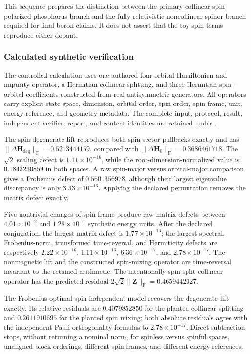 This sequence prepares the distinction between the primary collinear
spin-polarized phosphorus branch and the fully relativistic noncollinear spinor
branch required for final boron claims. It does not assert that the toy spin
terms reproduce either dopant.

\subsubsection{Calculated synthetic verification}

The controlled calculation uses one authored four-orbital Hamiltonian and
impurity operator, a Hermitian collinear splitting, and three Hermitian
spin--orbital coefficients constructed from real antisymmetric generators. All
operators carry explicit state-space, dimension, orbital-order, spin-order,
spin-frame, unit, energy-reference, and geometry metadata. The complete input,
protocol, result, independent verifier, report, and content identities are
retained under
.

The spin-degenerate lift reproduces both spin-sector pullbacks exactly and has
\(\lVert\Delta\mathbf H_{\mathrm{deg}}\rVert_{\mathrm F}
=0.5213444159\), compared with
\(\lVert\Delta\mathbf H_0\rVert_{\mathrm F}=0.3686461718\). The
\(\sqrt{2}\) scaling defect is \(1.11\times10^{-16}\), while the
root-dimension-normalized value is \(0.1843230859\) in both spaces. A raw
spin-major versus orbital-major comparison gives a Frobenius defect of
\(0.5601356978\), although their largest eigenvalue discrepancy is only
\(3.33\times10^{-16}\). Applying the declared permutation removes the matrix
defect exactly.

Five nontrivial changes of spin frame produce raw matrix defects between
\(4.01\times10^{-2}\) and \(1.28\times10^{-1}\) synthetic energy units.
After the declared conjugation, the largest matrix defect is
\(1.77\times10^{-16}\); the largest spectral, Frobenius-norm, transformed
time-reversal, and Hermiticity defects are respectively
\(2.22\times10^{-16}\), \(1.11\times10^{-16}\),
\(6.36\times10^{-17}\), and \(2.78\times10^{-17}\). The nonmagnetic lift
and the constructed spin-mixing operator are time-reversal invariant to the
retained arithmetic. The intentionally spin-split collinear operator has the
predicted residual \(2\sqrt{2}\lVert\mathbf Z\rVert_{\mathrm F}
=0.4659442027\).

The Frobenius-optimal spin-independent model recovers the degenerate lift
exactly. Its relative residuals are \(0.4079852850\) for the planted collinear
splitting and \(0.2611910695\) for the planted spin mixing; both absolute
residuals agree with the independent Pauli-orthogonality formulas to
\(2.78\times10^{-17}\). Direct subtraction stops, without returning a
nominal norm, for spinless versus spinful spaces, unaligned block orderings,
different spin frames, and different energy references.

